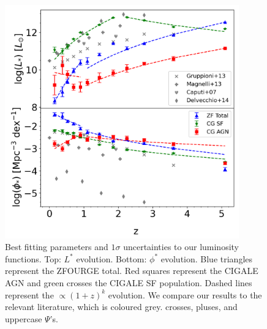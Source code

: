 \begin{figure}
    \centering
    \includegraphics[width=0.9\textwidth]{Figures/Param_Evo.png}
    \caption{Best fitting parameters and $1\sigma$ uncertainties to our luminosity functions. Top: $L^{*}$ evolution. Bottom: $\phi^{*}$ evolution. Blue triangles represent the ZFOURGE total. Red squares represent the CIGALE AGN and green crosses the CIGALE SF population. Dashed lines represent the $\propto(1+z)^k$ evolution. We compare our results to the relevant literature, which is coloured grey. \cite{gruppioni_herschel_2013} crosses, \cite{magnelli_deepest_2013} pluses, and \cite{caputi_infrared_2007} uppercase $\Psi$'s.}
    \label{Fig: Param Evo}
\end{figure}

